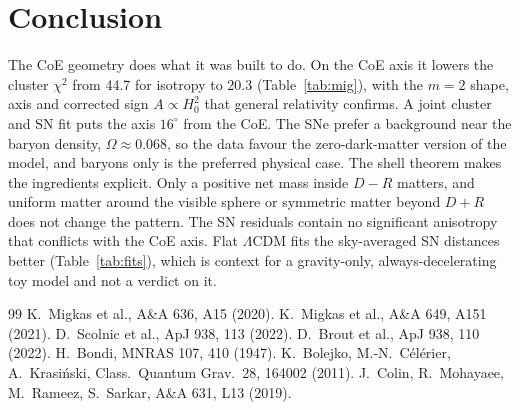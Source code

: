 \documentclass[10pt,twocolumn,letterpaper]{article}
\begin{document}
\section{Conclusion}
The CoE geometry does what it was built to do. On the CoE axis it lowers the cluster $\chi^2$ from 44.7 for isotropy to 20.3 (Table~\ref{tab:mig}), with the $m=2$ shape, axis and corrected sign $A\propto H_0^2$ that general relativity confirms. A joint cluster and SN fit puts the axis $16^\circ$ from the CoE. The SNe prefer a background near the baryon density, $\Omega\approx0.068$, so the data favour the zero-dark-matter version of the model, and baryons only is the preferred physical case. The shell theorem makes the ingredients explicit. Only a positive net mass inside $D-R$ matters, and uniform matter around the visible sphere or symmetric matter beyond $D+R$ does not change the pattern. The SN residuals contain no significant anisotropy that conflicts with the CoE axis. Flat $\Lambda$CDM fits the sky-averaged SN distances better (Table~\ref{tab:fits}), which is context for a gravity-only, always-decelerating toy model and not a verdict on it.

\clearpage
\begin{thebibliography}{99}\footnotesize
{} K.~Migkas et al., A\&A 636, A15 (2020).
 K.~Migkas et al., A\&A 649, A151 (2021).
 D.~Scolnic et al., ApJ 938, 113 (2022).
 D.~Brout et al., ApJ 938, 110 (2022).
 H.~Bondi, MNRAS 107, 410 (1947).
 K.~Bolejko, M.-N.~C\'el\'erier, A.~Krasi\'nski, Class.\ Quantum Grav.\ 28, 164002 (2011).
 J.~Colin, R.~Mohayaee, M.~Rameez, S.~Sarkar, A\&A 631, L13 (2019).
\end{thebibliography}
\end{document}
